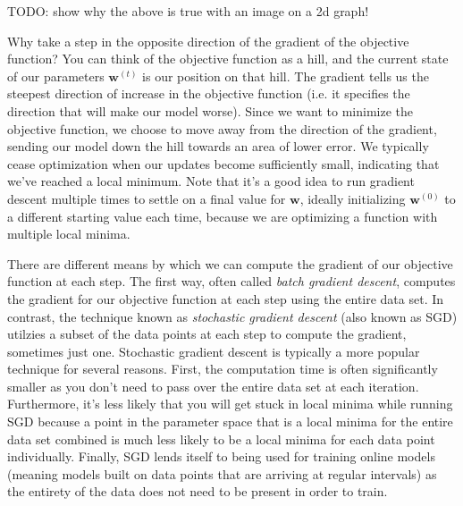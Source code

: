 TODO: show why the above is true with an image on a 2d graph!

Why take a step in the opposite direction of the gradient of the objective function? You can think of the objective function as a hill, and the current state of our parameters $\textbf{w}^{(t)}$ is our position on that hill. The gradient tells us the steepest direction of increase in the objective function (i.e. it specifies the direction that will make our model worse). Since we want to minimize the objective function, we choose to move away from the direction of the gradient, sending our model down the hill towards an area of lower error. We typically cease optimization when our updates become sufficiently small, indicating that we've reached a local minimum. Note that it's a good idea to run gradient descent multiple times to settle on a final value for $\textbf{w}$, ideally initializing $\textbf{w}^{(0)}$ to a different starting value each time, because we are optimizing a function with multiple local minima.

There are different means by which we can compute the gradient of our objective function at each step. The first way, often called \textit{batch gradient descent}, computes the gradient for our objective function at each step using the entire data set. In contrast, the technique known as \textit{stochastic gradient descent} (also known as SGD) utilzies a subset of the data points at each step to compute the gradient, sometimes just one. Stochastic gradient descent is typically a more popular technique for several reasons. First, the computation time is often significantly smaller as you don't need to pass over the entire data set at each iteration. Furthermore, it's less likely that you will get stuck in local minima while running SGD because a point in the parameter space that is a local minima for the entire data set combined is much less likely to be a local minima for each data point individually. Finally, SGD lends itself to being used for training online models (meaning models built on data points that are arriving at regular intervals) as the entirety of the data does not need to be present in order to train.

